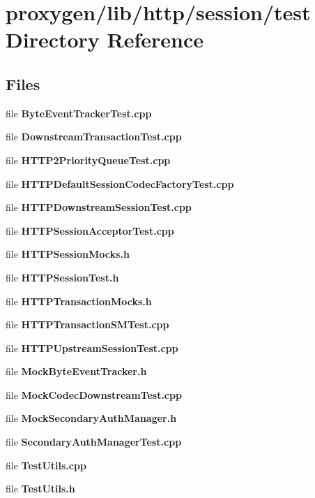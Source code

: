 \section{proxygen/lib/http/session/test Directory Reference}
\label{dir_97fc26c4d75f64a2cb9fe3ce6af93098}
\subsection*{Files}
\begin{DoxyCompactItemize}
\item 
file {\bf Byte\+Event\+Tracker\+Test.\+cpp}
\item 
file {\bf Downstream\+Transaction\+Test.\+cpp}
\item 
file {\bf H\+T\+T\+P2\+Priority\+Queue\+Test.\+cpp}
\item 
file {\bf H\+T\+T\+P\+Default\+Session\+Codec\+Factory\+Test.\+cpp}
\item 
file {\bf H\+T\+T\+P\+Downstream\+Session\+Test.\+cpp}
\item 
file {\bf H\+T\+T\+P\+Session\+Acceptor\+Test.\+cpp}
\item 
file {\bf H\+T\+T\+P\+Session\+Mocks.\+h}
\item 
file {\bf H\+T\+T\+P\+Session\+Test.\+h}
\item 
file {\bf H\+T\+T\+P\+Transaction\+Mocks.\+h}
\item 
file {\bf H\+T\+T\+P\+Transaction\+S\+M\+Test.\+cpp}
\item 
file {\bf H\+T\+T\+P\+Upstream\+Session\+Test.\+cpp}
\item 
file {\bf Mock\+Byte\+Event\+Tracker.\+h}
\item 
file {\bf Mock\+Codec\+Downstream\+Test.\+cpp}
\item 
file {\bf Mock\+Secondary\+Auth\+Manager.\+h}
\item 
file {\bf Secondary\+Auth\+Manager\+Test.\+cpp}
\item 
file {\bf Test\+Utils.\+cpp}
\item 
file {\bf Test\+Utils.\+h}
\end{DoxyCompactItemize}
